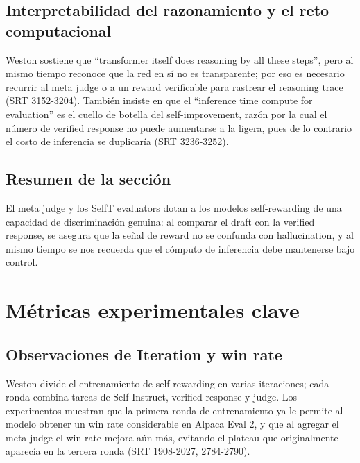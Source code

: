 \documentclass[a4paper]{article}
\begin{document}
\subsection{Interpretabilidad del razonamiento y el reto computacional}
Weston sostiene que ``transformer itself does reasoning by all these steps'', pero al mismo tiempo reconoce que la red en sí no es transparente; por eso es necesario recurrir al meta judge o a un reward verificable para rastrear el reasoning trace (SRT 3152-3204). También insiste en que el ``inference time compute for evaluation'' es el cuello de botella del self-improvement, razón por la cual el número de verified response no puede aumentarse a la ligera, pues de lo contrario el costo de inferencia se duplicaría (SRT 3236-3252).

\subsection{Resumen de la sección}
El meta judge y los SelfT evaluators dotan a los modelos self-rewarding de una capacidad de discriminación genuina: al comparar el draft con la verified response, se asegura que la señal de reward no se confunda con hallucination, y al mismo tiempo se nos recuerda que el cómputo de inferencia debe mantenerse bajo control.

\section{Métricas experimentales clave}
\subsection{Observaciones de Iteration y win rate}
Weston divide el entrenamiento de self-rewarding en varias iteraciones; cada ronda combina tareas de Self-Instruct, verified response y judge. Los experimentos muestran que la primera ronda de entrenamiento ya le permite al modelo obtener un win rate considerable en Alpaca Eval 2, y que al agregar el meta judge el win rate mejora aún más, evitando el plateau que originalmente aparecía en la tercera ronda (SRT 1908-2027, 2784-2790).
\end{document}
